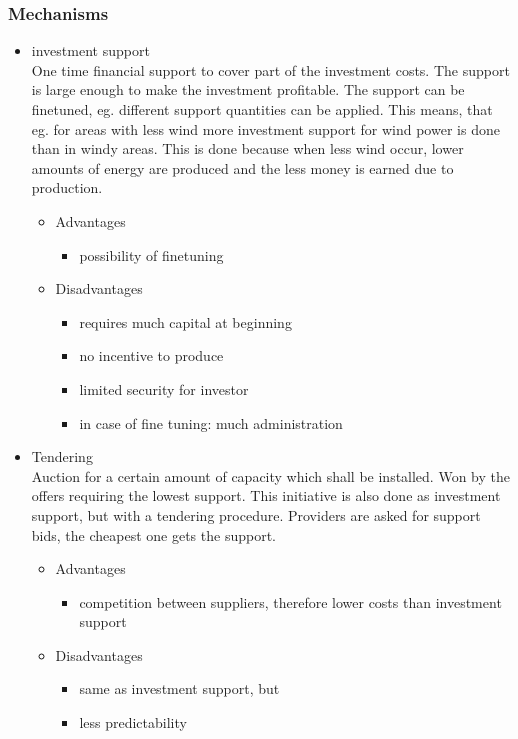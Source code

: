 \documentclass{article}
\begin{document}
\subsubsection{Mechanisms}
\begin{itemize}
\item investment support\\
One time financial support to cover part of the investment costs.  The support is large enough to make the investment profitable. The support can be finetuned, eg. different support quantities can be applied. This means, that eg. for areas with less wind more investment support for wind power is done than in windy areas. This is done because when less wind occur, lower amounts of energy are produced and the less money is earned due to production.
\begin{itemize}
\item Advantages
\begin{itemize}
\item possibility of finetuning
\end{itemize}
\item Disadvantages
\begin{itemize}
\item requires much capital at beginning
\item no incentive to produce
\item limited security for investor
\item in case of fine tuning: much administration
\end{itemize}
\end{itemize}
\item Tendering\\
Auction for a certain amount of capacity which shall be installed. Won by the offers requiring the lowest support. This initiative is also done as investment support, but with a tendering procedure. Providers are asked for support bids, the cheapest one gets the support.
\begin{itemize}
\item Advantages
\begin{itemize}
\item competition between suppliers, therefore lower costs than investment support
\end{itemize}
\item Disadvantages
\begin{itemize}
\item same as investment support, but
\item less predictability

\end{itemize}
\end{itemize}
\end{itemize}
\end{document}
